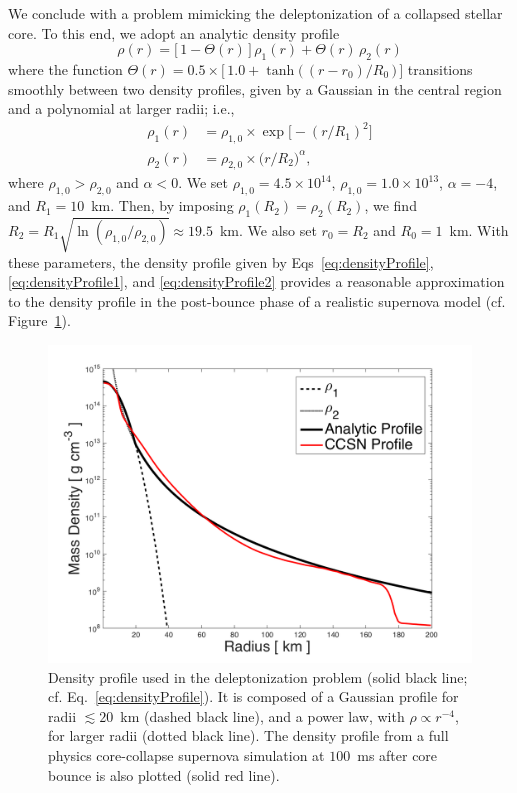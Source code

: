 \documentclass[10pt,preprint]{aastex}
\begin{document}
We conclude with a problem mimicking the deleptonization of a collapsed stellar core.  
To this end, we adopt an analytic density profile
\begin{equation}
  \rho(r)=\big[\,1-\Theta(r)\,\big]\,\rho_{1}(r)+\Theta(r)\,\rho_{2}(r)
  \label{eq:densityProfile}
\end{equation}
where the function $\Theta(r)=0.5\times\big[\,1.0+\tanh\big(\,(r-r_{0})/R_{0}\,\big)\,\big]$ transitions smoothly between two density profiles, given by a Gaussian in the central region and a polynomial at larger radii; i.e.,
\begin{align}
  \rho_{1}(r)
  &=\rho_{1,0}\times\exp\big[-(r/R_{1})^{2}\big]
  \label{eq:densityProfile1} \\
  \rho_{2}(r)
  &=\rho_{2,0}\times\big(r/R_{2}\big)^{\alpha},
  \label{eq:densityProfile2}
\end{align}
where $\rho_{1,0}>\rho_{2,0}$ and $\alpha<0$.  
We set $\rho_{1,0}=4.5\times10^{14}$, $\rho_{1,0}=1.0\times10^{13}$, $\alpha=-4$, and $R_{1}=10$~km.  
Then, by imposing $\rho_{1}(R_{2})=\rho_{2}(R_{2})$, we find $R_{2}=R_{1}\sqrt{\ln(\rho_{1,0}/\rho_{2,0})}\approx19.5$~km.  
We also set $r_{0}=R_{2}$ and $R_{0}=1$~km.  
With these parameters, the density profile given by Eqs~\eqref{eq:densityProfile}, \eqref{eq:densityProfile1}, and \eqref{eq:densityProfile2} provides a reasonable approximation to the density profile in the post-bounce phase of a realistic supernova model (cf. Figure~\ref{fig:analyticDensityProfile}).  

\begin{figure}
  \begin{center}
      \includegraphics[scale=0.78]{./Figures/AnalyticDensityProfile}
  \end{center}
  \caption{Density profile used in the deleptonization problem (solid black line; cf. Eq.~\eqref{eq:densityProfile}).  
  It is composed of a Gaussian profile for radii $\lesssim20$~km (dashed black line), and a power law, with $\rho\propto r^{-4}$, for larger radii (dotted black line).  
  The density profile from a full physics core-collapse supernova simulation at $100$~ms after core bounce is also plotted (solid red line).  }
  \label{fig:analyticDensityProfile}
\end{figure}
\end{document}
